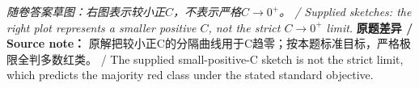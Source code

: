 

\emph{随卷答案草图：右图表示较小正\(C\)，不表示严格\(C\to0^+\)。 / Supplied sketches: the right plot represents a smaller positive \(C\), not the strict \(C\to0^+\) limit.}
\textbf{原题差异 / Source note：} 原解把较小正C的分隔曲线用于C趋零；按本题标准目标，严格极限全判多数红类。 / The supplied small-positive-C sketch is not the strict limit, which predicts the majority red class under the stated standard objective.
